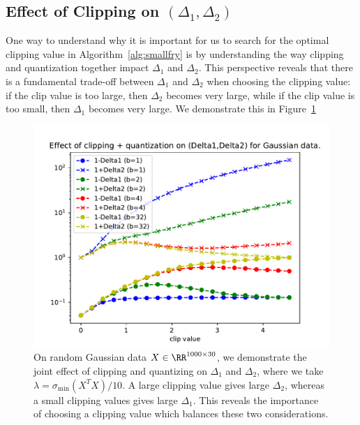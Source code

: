 \subsection{Effect of Clipping on $(\Delta_1,\Delta_2)$}
One way to understand why it is important for us to search for the optimal clipping value in Algorithm~\ref{alg:smallfry} is by understanding the way clipping and quantization together impact $\Delta_1$ and $\Delta_2$.
This perspective reveals that there is a fundamental trade-off between $\Delta_1$ and $\Delta_2$ when choosing the clipping value:
if the clip value is too large, then $\Delta_2$ becomes very large, while if the clip value is too small, then $\Delta_1$ becomes very large.
We demonstrate this in Figure~\ref{fig:deltas_vs_clip_quant}
\begin{figure}
	\begin{center}
		\centerline{\includegraphics[width=0.8\columnwidth]{figures/deltas_vs_clip_and_quant.pdf}}
		\caption{On random Gaussian data $X \in \RR^{1000\times 30}$, we demonstrate the joint effect of clipping and quantizing on $\Delta_1$ and $\Delta_2$, where we take $\lambda = \sigma_{\min}(X^T X)/10$.
		A large clipping value gives large $\Delta_2$, whereas a small clipping values gives large $\Delta_1$.
		This reveals the importance of choosing a clipping value which balances these two considerations.
		}
		\label{fig:deltas_vs_clip_quant}
	\end{center}
\end{figure}
